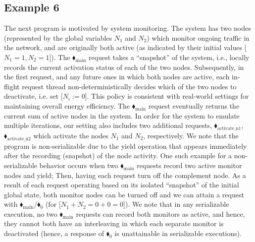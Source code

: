 \subsection{Example 6}



The next program is motivated by system monitoring.
The system has two nodes (represented by the global variables $N_1$ and $N_2$) which monitor ongoing traffic in the network, and are originally both active (as indicated by their initial values [$N_1=1,N_2=1$]).
%
The {\color{ForestGreen}$\blacklozenge_\text{main}$} request takes a ``snapshot'' of the system, i.e., locally records the current activation status of each of the two nodes.
%
Subsequently, in the first request, and any future ones in which both nodes are active, each in-flight request thread  non-deterministically decides which of the two nodes to deactivate, i.e. set [$N_i:=0$]. This policy is consistent with real-world settings for maintaining overall energy efficiency.
%
The {\color{ForestGreen}$\blacklozenge_\text{main}$} request eventually returns the current sum of active nodes in the system.
%
In order for the system to emulate multiple iterations, our setting also includes two additional requests, {\color{ForestGreen}$\blacklozenge_\text{activate\_n1}$},{\color{ForestGreen}$\blacklozenge_\text{activate\_n2}$} which activate the nodes $N_1$ and $N_2$, respectively.
%
We note that the program is non-serializable due to the yield operation that appears immediately after the recording (snapshot) of the node activity. One such example for a non-serializable behavior occurs when two {\color{ForestGreen}$\blacklozenge_\text{main}$} requests record two active monitor nodes and yield; Then, having each request turn off the complement node. As a result of each request operating based on its isolated ``snapshot'' of the initial global state, both monitor nodes can be turned off and we can attain a request with {\color{ForestGreen}$\blacklozenge_\text{main}$}/{\color{red}$\blacklozenge_0$} (for [$N_1+N_2=0+0=0$]).
%
We note that in any serializable execution, no two {\color{ForestGreen}$\blacklozenge_\text{main}$} requests can record both monitors as active, and hence, they cannot both have an interleaving in which each separate monitor is deactivated (hence, a response of {\color{red}$\blacklozenge_0$} is unattainable in serializable executions).





